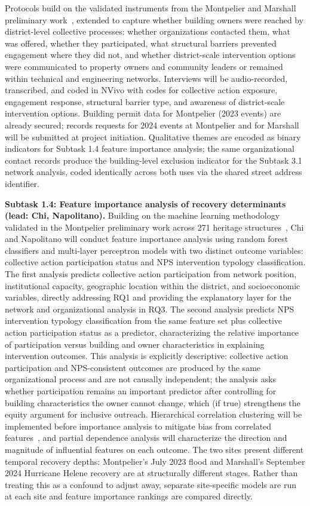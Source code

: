 \documentclass[11pt]{article}
\begin{document}
Protocols build on the validated instruments from the Montpelier and Marshall
preliminary work~\cite{maalouf2025a,maalouf2025b}, extended to capture whether
building owners were reached by district-level collective processes: whether
organizations contacted them, what was offered, whether they participated, what
structural barriers prevented engagement where they did not, and whether
district-scale intervention options were communicated to property owners and
community leaders or remained within technical and engineering networks.
Interviews will be audio-recorded, transcribed, and coded in NVivo with codes
for collective action exposure, engagement response, structural barrier type, and
awareness of district-scale intervention options.
Building permit data for Montpelier (2023 events) are already secured; records
requests for 2024 events at Montpelier and for Marshall will be submitted at
project initiation.
Qualitative themes are encoded as binary indicators for Subtask 1.4 feature
importance analysis; the same organizational contact records produce the
building-level exclusion indicator for the Subtask 3.1 network analysis, coded
identically across both uses via the shared street address identifier.

\textbf{Subtask 1.4: Feature importance analysis of recovery determinants (lead: Chi, Napolitano).}
Building on the machine learning methodology validated in the Montpelier preliminary
work across 271 heritage structures~\cite{maalouf2025a,kallas2024}, Chi and Napolitano
will conduct feature importance analysis using random forest classifiers and
multi-layer perceptron models with two distinct outcome variables: collective action
participation status and NPS intervention typology classification.
The first analysis predicts collective action participation from network position,
institutional capacity, geographic location within the district, and socioeconomic
variables, directly addressing RQ1 and providing the explanatory layer for the
network and organizational analysis in RQ3.
The second analysis predicts NPS intervention typology classification from the same
feature set plus collective action participation status as a predictor, characterizing
the relative importance of participation versus building and owner characteristics
in explaining intervention outcomes.
This analysis is explicitly descriptive: collective action participation and
NPS-consistent outcomes are produced by the same organizational process and are
not causally independent; the analysis asks whether participation remains an
important predictor after controlling for building characteristics the owner cannot
change, which (if true) strengthens the equity argument for inclusive outreach.
Hierarchical correlation clustering will be implemented before importance analysis
to mitigate bias from correlated features~\cite{maalouf2025a}, and partial dependence
analysis will characterize the direction and magnitude of influential features on
each outcome.
The two sites present different temporal recovery depths: Montpelier's July 2023
flood and Marshall's September 2024 Hurricane Helene recovery are at structurally
different stages.
Rather than treating this as a confound to adjust away, separate site-specific
models are run at each site and feature importance rankings are compared directly.
\end{document}
